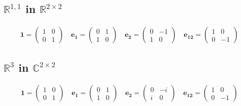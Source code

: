 \documentclass[a4paper]{book}
\numberwithin{equation}{chapter}
\begin{document}
    \subsection{$\mathbb{R}^{1,1}$ in $\mathbb{R}^{2 \times 2}$}

    \begin{align*}
    \mathbf{1}=
    \begin{pmatrix}
     1 &0 \\
     0 &1
    \end{pmatrix}
    \quad
    \mathbf{e_1}=
    \begin{pmatrix}
     0 &1 \\
     1 &0
    \end{pmatrix}
    \quad
    \mathbf{e_2}=
    \begin{pmatrix}
     0 &-1 \\
     1 &0
    \end{pmatrix}
    \quad
    \mathbf{e_{12}}=
    \begin{pmatrix}
     1 &0 \\
    0 &-1
    \end{pmatrix}
    \end{align*}
    
    
    \subsection{$\mathbb{R}^{3}$ in $\mathbb{C}^{2 \times 2}$}

    \begin{align*}
    \mathbf{1}=
    \begin{pmatrix}
    1 &0 \\
    0 &1
    \end{pmatrix}
    \quad
    \mathbf{e_1}=
    \begin{pmatrix}
     0 &1 \\
     1 &0
    \end{pmatrix}
    \quad
    \mathbf{e_2}=
    \begin{pmatrix}
     0 &-i \\
     i &0
    \end{pmatrix}
    \quad
    \mathbf{e_{12}}=
    \begin{pmatrix}
     1 &0 \\
     0 &-1
    \end{pmatrix}
    \end{align*}
\end{document}

